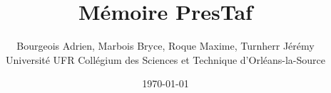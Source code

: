 \documentclass{article}%
\begin{document}
\title{Mémoire PresTaf}

\author{Bourgeois Adrien, Marbois Bryce, Roque Maxime, Turnherr Jérémy%
\\Université UFR Collégium des Sciences et Technique d'Orléans-la-Source}
\date{\today}
\maketitle



\clearpage

\tableofcontents

\cleardoublepage

























\appendix

\printglossaries

{}


\end{document}
